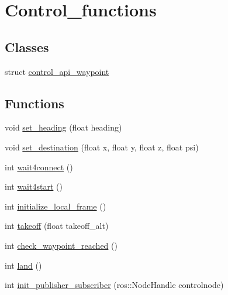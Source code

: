 \hypertarget{group__control__functions}{}\section{Control\+\_\+functions}
\label{group__control__functions}
\subsection*{Classes}
\begin{DoxyCompactItemize}
\item 
struct \mbox{\hyperlink{structcontrol__api__waypoint}{control\+\_\+api\+\_\+waypoint}}
\end{DoxyCompactItemize}
\subsection*{Functions}
\begin{DoxyCompactItemize}
\item 
void \mbox{\hyperlink{group__control__functions_ga92292bc0da7dd2a58edf8e9aa10eb682}{set\+\_\+heading}} (float heading)
\item 
void \mbox{\hyperlink{group__control__functions_gab90a45d8b081ba329b9d0f886adbc2d5}{set\+\_\+destination}} (float x, float y, float z, float psi)
\item 
int \mbox{\hyperlink{group__control__functions_ga1921a30d419eb397f7e40875217b45d1}{wait4connect}} ()
\item 
int \mbox{\hyperlink{group__control__functions_gab6fe46f505ab9804b4ed98b96286a811}{wait4start}} ()
\item 
int \mbox{\hyperlink{group__control__functions_ga2a1100bb15673a9322c5be3bb8e9999f}{initialize\+\_\+local\+\_\+frame}} ()
\item 
int \mbox{\hyperlink{group__control__functions_gac0aa671c99c09687515ec5bb8891c7d2}{takeoff}} (float takeoff\+\_\+alt)
\item 
int \mbox{\hyperlink{group__control__functions_ga54abc3f6eae022a8710bc0c2e1c54fbe}{check\+\_\+waypoint\+\_\+reached}} ()
\item 
int \mbox{\hyperlink{group__control__functions_ga52a11a139e56315de52d2ab439b0d203}{land}} ()
\item 
int \mbox{\hyperlink{group__control__functions_gae693b071b5392f9253cdfc1f4f362fcc}{init\+\_\+publisher\+\_\+subscriber}} (ros\+::\+Node\+Handle controlnode)
\end{DoxyCompactItemize}


